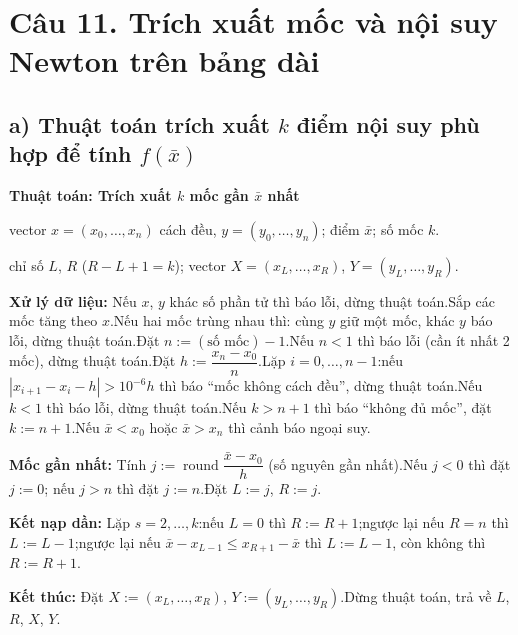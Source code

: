 \documentclass[11pt,a4paper]{article}
\newenvironment{thuattoan}[1]
  {\par\medskip\noindent\textbf{Thuật toán: #1}\begin{description}[style=standard,align=left,leftmargin=4.3em,labelwidth=3.9em,labelsep=0.4em,itemsep=1pt,topsep=3pt,font=\normalfont\bfseries]}
  {\end{description}}
\newcommand{\thut}{\newline\hspace*{1.2em}}
\begin{document}
\section{Câu 11. Trích xuất mốc và nội suy Newton trên bảng dài}

\subsection{a) Thuật toán trích xuất $k$ điểm nội suy phù hợp để tính $f(\bar x)$}
\begin{thuattoan}{Trích xuất $k$ mốc gần $\bar x$ nhất}
\item[Input:] vector $x=(x_0,\dots,x_n)$ cách đều, $y=(y_0,\dots,y_n)$; điểm $\bar x$; số mốc $k$.
\item[Output:] chỉ số $L$, $R$ ($R-L+1=k$); vector $X=(x_L,\dots,x_R)$, $Y=(y_L,\dots,y_R)$.
\item[Bước 0:] \textbf{Xử lý dữ liệu:} Nếu $x$, $y$ khác số phần tử thì báo lỗi, dừng thuật toán.\newline Sắp các mốc tăng theo $x$.\newline Nếu hai mốc trùng nhau thì: cùng $y$ giữ một mốc, khác $y$ báo lỗi, dừng thuật toán.\newline Đặt $n:=(\text{số mốc})-1$.\newline Nếu $n<1$ thì báo lỗi (cần ít nhất 2 mốc), dừng thuật toán.\newline Đặt $h:=\dfrac{x_n-x_0}{n}$.\newline Lặp $i=0,\dots,n-1$:\thut nếu $|x_{i+1}-x_i-h|>10^{-6}h$ thì báo ``mốc không cách đều'', dừng thuật toán.\newline Nếu $k<1$ thì báo lỗi, dừng thuật toán.\newline Nếu $k>n+1$ thì báo ``không đủ mốc'', đặt $k:=n+1$.\newline Nếu $\bar x<x_0$ hoặc $\bar x>x_n$ thì cảnh báo ngoại suy.
\item[Bước 1:] \textbf{Mốc gần nhất:} Tính $j:=\operatorname{round}\dfrac{\bar x-x_0}{h}$ (số nguyên gần nhất).\newline Nếu $j<0$ thì đặt $j:=0$; nếu $j>n$ thì đặt $j:=n$.\newline Đặt $L:=j$, $R:=j$.
\item[Bước 2:] \textbf{Kết nạp dần:} Lặp $s=2,\dots,k$:\thut nếu $L=0$ thì $R:=R+1$;\thut ngược lại nếu $R=n$ thì $L:=L-1$;\thut ngược lại nếu $\bar x-x_{L-1}\le x_{R+1}-\bar x$ thì $L:=L-1$, còn không thì $R:=R+1$.
\item[Bước 3:] \textbf{Kết thúc:} Đặt $X:=(x_L,\dots,x_R)$, $Y:=(y_L,\dots,y_R)$.\newline Dừng thuật toán, trả về $L$, $R$, $X$, $Y$.
\end{thuattoan}
\end{document}
